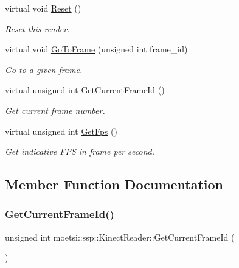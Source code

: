 \begin{DoxyCompactItemize}
\mbox{\label{classmoetsi_1_1ssp_1_1KinectReader_a0ad8f7b57ef04554e41a66db797c000e}} 
virtual void \hyperlink{classmoetsi_1_1ssp_1_1KinectReader_a0ad8f7b57ef04554e41a66db797c000e}{Reset} ()
\begin{DoxyCompactList}\small\item\em Reset this reader. \end{DoxyCompactList}\item 
virtual void \hyperlink{classmoetsi_1_1ssp_1_1KinectReader_a315690c46e153a35d4ded1189e93af08}{Go\+To\+Frame} (unsigned int frame\+\_\+id)
\begin{DoxyCompactList}\small\item\em Go to a given frame. \end{DoxyCompactList}\item 
virtual unsigned int \hyperlink{classmoetsi_1_1ssp_1_1KinectReader_aa17e268723c41bdad5082575decb28eb}{Get\+Current\+Frame\+Id} ()
\begin{DoxyCompactList}\small\item\em Get current frame number. \end{DoxyCompactList}\item 
virtual unsigned int \hyperlink{classmoetsi_1_1ssp_1_1KinectReader_ac88c13693ce8e2e249438ac8de8a7b3c}{Get\+Fps} ()
\begin{DoxyCompactList}\small\item\em Get indicative F\+PS in frame per second. \end{DoxyCompactList}\end{DoxyCompactItemize}


\subsection{Member Function Documentation}
\mbox{\label{classmoetsi_1_1ssp_1_1KinectReader_aa17e268723c41bdad5082575decb28eb}} 
\subsubsection{\texorpdfstring{Get\+Current\+Frame\+Id()}{GetCurrentFrameId()}}
{\footnotesize\ttfamily unsigned int moetsi\+::ssp\+::\+Kinect\+Reader\+::\+Get\+Current\+Frame\+Id (\begin{DoxyParamCaption}{ }\end{DoxyParamCaption})\hspace{0.3cm}{\ttfamily [virtual]}}



